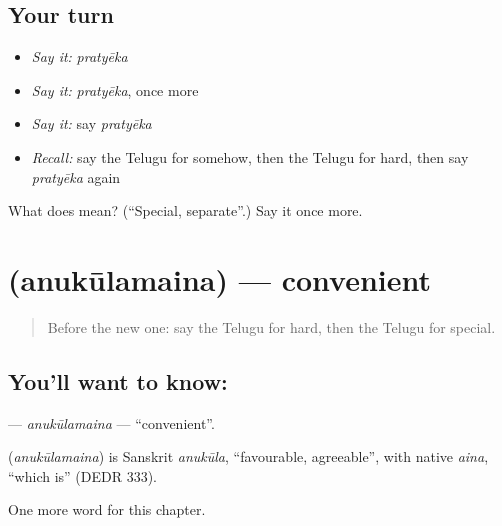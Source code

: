 \subsection*{Your turn}
\begin{itemize}
\raggedright
  \item \emph{Say it:} \emph{pratyēka}
  \item \emph{Say it:} \emph{pratyēka}, once more
  \item \emph{Say it:} say \emph{pratyēka}
  \item \emph{Recall:} say the Telugu for somehow, then the Telugu for hard, then say \emph{pratyēka} again
\end{itemize}

\begin{tcolorbox}[breakable,colback=teal!4,colframe=teal!35!black,title={Before you move on}]
What does  mean? (\textquotedblleft{}Special, separate\textquotedblright{}.) Say it once more.
\end{tcolorbox}
\section[\texorpdfstring{\te{అనుకూలమైన} (anukūlamaina)}{అనుకూలమైన (anukūlamaina)}]{ (anukūlamaina) — convenient}

\label{lesson:TE-C296-anukulamaina}



\begin{quote}
Before the new one: say the Telugu for hard, then the Telugu for special.
\end{quote}

\subsection*{You'll want to know: }
\textbf{} — \emph{anukūlamaina} — \textquotedblleft{}convenient\textquotedblright{}.

\begin{cousinweb}
\textbf{} (\emph{anukūlamaina}) is Sanskrit \emph{anukūla}, \textquotedblleft{}favourable, agreeable\textquotedblright{}, with native \emph{aina}, \textquotedblleft{}which is\textquotedblright{} (DEDR 333).
\end{cousinweb}

\begin{grammarlens}[title={What you've built}]
One more word for this chapter.
\end{grammarlens}

